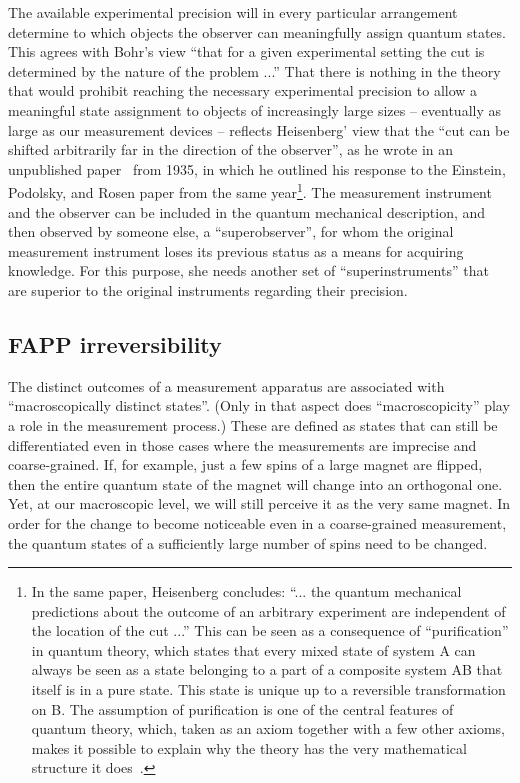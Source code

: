 \documentclass[12pt]{article}
\begin{document}
The available experimental precision will in every particular arrangement determine to which objects the observer can meaningfully assign quantum states. This agrees with Bohr's view ``that for a given experimental setting the cut is determined by the nature of the problem ...'' That there is nothing in the theory that would prohibit reaching the necessary experimental precision to allow a meaningful state assignment to objects of increasingly large sizes -- eventually as large as our measurement devices -- reflects Heisenberg' view that the ``cut can be shifted arbitrarily far in the direction of the observer'', as he wrote in an unpublished paper~\cite{heisenberg} from 1935, in which he outlined his response to the Einstein, Podolsky, and Rosen paper from the same year\footnote{In the same paper, Heisenberg concludes: ``... the quantum mechanical predictions about the outcome of an arbitrary experiment are independent of the location of the cut ...'' This can be seen as a consequence of ``purification'' in quantum theory, which states that every mixed state of system A can always be seen as a state belonging to a part of a composite system AB that itself is in a pure state. This state is unique up to a reversible transformation on B. The assumption of purification is one of the central features of quantum theory, which, taken as an axiom together with a few other axioms, makes it possible to explain why the theory has the very mathematical structure it does~\cite{chiribella}.}. The measurement instrument and the observer can be included in the quantum mechanical description, and then observed by someone else, a ``superobserver'', for whom the original measurement instrument loses its previous status as a means for acquiring knowledge. For this purpose, she needs another set of ``superinstruments'' that are superior to the original instruments regarding their precision. 

\subsection*{FAPP  irreversibility}
 
The distinct outcomes of a measurement apparatus are associated with ``macroscopically distinct states''. (Only in that aspect does ``macroscopicity'' play a role in the measurement process.) These are defined as states that can still be differentiated even in those cases where the measurements are imprecise and coarse-grained. If, for example, just a few spins of a large magnet are flipped, then the entire quantum state of the magnet will change into an orthogonal one. Yet, at our macroscopic level, we will still perceive it as the very same magnet. In order for the change to become noticeable even in a coarse-grained measurement, the quantum states of a sufficiently large number of spins need to be changed.   
\end{document}
